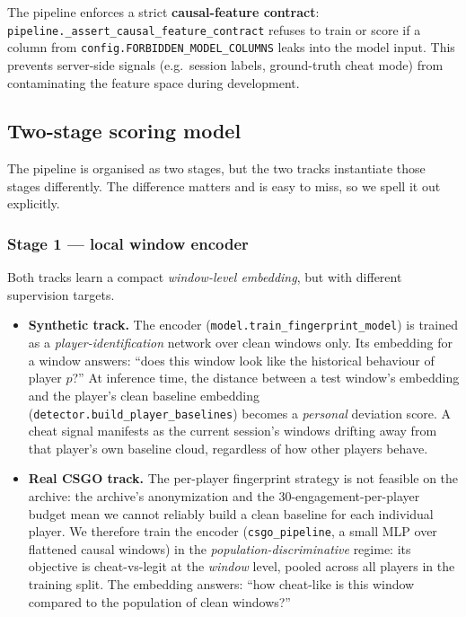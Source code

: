 \documentclass[conference,10pt]{IEEEtran}
\begin{document}
The pipeline enforces a strict \textbf{causal-feature contract}:
\texttt{pipeline.\_assert\_causal\_feature\_contract} refuses to train
or score if a column from
\texttt{config.FORBIDDEN\_MODEL\_COLUMNS} leaks into the model input.
This prevents server-side signals (e.g.\ session labels, ground-truth
cheat mode) from contaminating the feature space during development.

\subsection{Two-stage scoring model}

The pipeline is organised as two stages, but the two tracks
instantiate those stages differently. The difference matters and is
easy to miss, so we spell it out explicitly.

\subsubsection*{Stage 1 --- local window encoder}
Both tracks learn a compact \emph{window-level embedding}, but with
different supervision targets.
\begin{itemize}
  \item \textbf{Synthetic track.} The encoder
    (\texttt{model.train\_fingerprint\_model}) is trained as a
    \emph{player-identification} network over clean windows only. Its
    embedding for a window answers: ``does this window look like the
    historical behaviour of player $p$?'' At inference time, the
    distance between a test window's embedding and the player's clean
    baseline embedding (\texttt{detector.build\_player\_baselines})
    becomes a \emph{personal} deviation score. A cheat signal manifests
    as the current session's windows drifting away from that player's
    own baseline cloud, regardless of how other players behave.
  \item \textbf{Real CSGO track.} The per-player fingerprint strategy is
    not feasible on the archive: the archive's anonymization and the
    $30$-engagement-per-player budget mean we cannot reliably build a
    clean baseline for each individual player. We therefore train the
    encoder (\texttt{csgo\_pipeline}, a small MLP over flattened causal
    windows) in the \emph{population-discriminative} regime: its
    objective is cheat-vs-legit at the \emph{window} level, pooled
    across all players in the training split. The embedding answers:
    ``how cheat-like is this window compared to the population of clean
    windows?''
\end{itemize}
\end{document}
